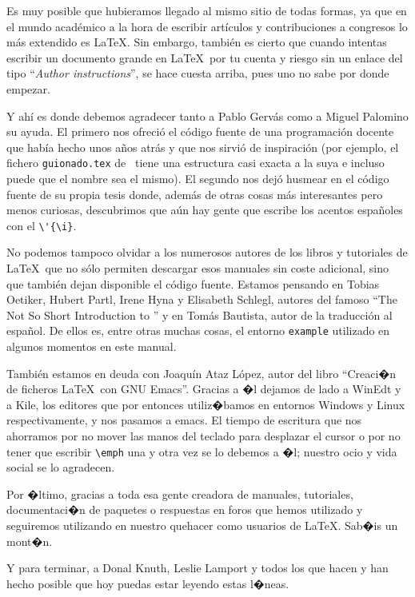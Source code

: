 Es muy posible que hubieramos llegado al mismo sitio de todas formas,
ya que en el mundo acad\'emico a la hora de escribir art\'iculos y
contribuciones a congresos lo m\'as extendido es \LaTeX. Sin embargo,
tambi\'en es cierto que cuando intentas escribir un documento grande
en \LaTeX\ por tu cuenta y riesgo sin un enlace del tipo ``\emph{Author
  instructions}'', se hace cuesta arriba, pues uno no sabe por donde
empezar.

Y ah\'i es donde debemos agradecer tanto a Pablo Gerv\'as como a Miguel
Palomino su ayuda. El primero nos ofreci\'o el c\'odigo fuente de una
programaci\'on docente que hab\'ia hecho unos a\~{n}os atr\'as y que nos sirvi\'o
de inspiraci\'on (por ejemplo, el fichero \texttt{guionado.tex} de
\texis\ tiene una estructura casi exacta a la suya e incluso puede
que el nombre sea el mismo). El segundo nos dej\'o husmear en el c\'odigo
fuente de su propia tesis donde, adem\'as de otras cosas m\'as
interesantes pero menos curiosas, descubrimos que a\'un hay gente que
escribe los acentos espa\~{n}oles con el \verb+\'{\i}+.

No podemos tampoco olvidar a los numerosos autores de los libros y
tutoriales de \LaTeX\ que no s\'olo permiten descargar esos manuales sin
coste adicional, sino que tambi\'en dejan disponible el c\'odigo fuente.
Estamos pensando en Tobias Oetiker, Hubert Partl, Irene Hyna y
Elisabeth Schlegl, autores del famoso ``The Not So Short Introduction
to \LaTeXe'' y en Tom\'as Bautista, autor de la traducci\'on al espa\~{n}ol. De
ellos es, entre otras muchas cosas, el entorno \texttt{example}
utilizado en algunos momentos en este manual.

Tambi\'en estamos en deuda con Joaqu\'in Ataz L\'opez, autor del libro
``Creaci�n de ficheros \LaTeX\ con {GNU} Emacs''. Gracias a �l dejamos
de lado a WinEdt y a Kile, los editores que por entonces utiliz�bamos
en entornos Windows y Linux respectivamente, y nos pasamos a emacs. El
tiempo de escritura que nos ahorramos por no mover las manos del
teclado para desplazar el cursor o por no tener que escribir
\verb+\emph+ una y otra vez se lo debemos a �l; nuestro ocio y vida
social se lo agradecen.

Por �ltimo, gracias a toda esa gente creadora de manuales, tutoriales,
documentaci�n de paquetes o respuestas en foros que hemos utilizado y
seguiremos utilizando en nuestro quehacer como usuarios de
\LaTeX. Sab�is un mont�n.

Y para terminar, a Donal Knuth, Leslie Lamport y todos los que hacen y
han hecho posible que hoy puedas estar leyendo estas l�neas.

\endinput
